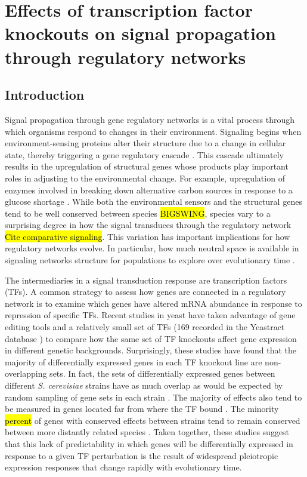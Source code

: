 \chapter{Effects of transcription factor knockouts on signal propagation through regulatory networks}
\label{chpt:networks}

\section{Introduction}
\label{sec:intro}

Signal propagation through gene regulatory networks is a vital process through which organisms respond to changes in their environment. Signaling begins when environment-sensing proteins alter their structure due to a change in cellular state, thereby triggering a gene regulatory cascade \cite{Bahn2007}. This cascade ultimately results in the upregulation of structural genes whose products play important roles in adjusting to the environmental change. For example, upregulation of enzymes involved in breaking down alternative carbon sources in response to a glucose shortage \cite{Gancedo1998}. While both the environmental sensors and the structural genes tend to be well conserved between species \hl{BIGSWING}, species vary to a surprising degree in how the signal transduces through the regulatory network \hl{Cite comparative signaling}. This variation has important implications for how regulatory networks evolve. In particular, how much neutral space is available in signaling networks structure for populations to explore over evolutionary time \cite{Payne2015}.

The intermediaries in a signal transduction response are transcription factors (TFs). A common strategy to assess how genes are connected in a regulatory network is to examine which genes have altered mRNA abundance in response to repression of specific TFs. Recent studies in yeast have taken advantage of gene editing tools and a relatively small set of TFs (169 recorded in the Yeastract database \cite{Hahn2011}) to compare how the same set of TF knockouts affect gene expression in different genetic backgrounds. Surprisingly, these studies have found that the majority of differentially expressed genes in each TF knockout line are non-overlapping sets. In fact, the sets of differentially expressed genes between different \textit{S. cerevisiae} strains have as much overlap as would be expected by random sampling of gene sets in each strain \cite{Li2025}. The majority of effects also tend to be measured in genes located far from where the TF bound \cite{Mahendrawada2025}. The minority \hl{percent} of genes with conserved effects between strains tend to remain conserved between more distantly related species \cite{Liu2024}. Taken together, these studies suggest that this lack of predictability in which genes will be differentially expressed in response to a given TF perturbation is the result of widespread pleiotropic expression responses that change rapidly with evolutionary time. 

